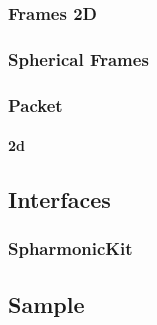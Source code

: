 \documentclass[12pt,a4paper]{article}
\begin{document}
\subsubsection{Frames 2D}



\subsubsection{Spherical Frames}




% 



% 



% 

\subsubsection{Packet}

\paragraph{2d}





\subsection{Interfaces}

\subsubsection{SpharmonicKit}





\subsection{Sample}
\end{document}
